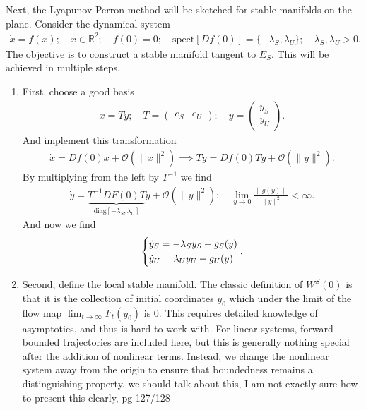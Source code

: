 Next, the Lyapunov-Perron method will be sketched for stable manifolds on the plane. Consider the dynamical system
\begin{align}
	\dot{x} = f(x);\quad x \in \mathbb{R}^{2};\quad f(0)=0;\quad  \textrm{spect} [Df(0)] = \{ - \lambda _{S}, \lambda _{U}\};\quad \lambda _S, \lambda_U > 0. \label{eq9:LP_method1}
\end{align}
The objective is to construct a stable manifold tangent to $E_{S}$. This will be achieved in multiple steps.
\begin{enumerate}
	\item First, choose a good basis
		\begin{align}
			x = Ty;\quad T = 
			\begin{pmatrix}
				e_{S} & e_{U}
			\end{pmatrix}
		;\quad y =
		\begin{pmatrix}
			y_S \\
			y_U
		\end{pmatrix}
		.
		\end{align}
	And implement this transformation 
	\begin{align}
		\dot{x} = Df(0)x + \mathcal{O}(\|x\|^{2}) \implies T\dot{y} = Df(0)Ty + \mathcal{O}(\| y\|^{2}).
	\end{align}
	By multiplying from the left by $T^{-1}$ we find
	\begin{align}
		\dot{y} = \underbrace{T^{-1}DF(0)T}_{ \textrm{diag} [-\lambda_S, \lambda_U ]}y + \mathcal{O}(\|y\|^{2});\quad \lim_{y \to 0} \frac{\|g(y)\|}{\|y\|^{2}}< \infty .
	\end{align}
	And now we find
	\begin{align}
		\begin{dcases}
			\dot{y}_{S} = - \lambda _{S}y_{S} + g_{S}(y) \\
			\dot{y}_{U} = \lambda _{U}y_{U} + g_{U}(y)
		\end{dcases}
		.
	\end{align}

\item Second, define the local stable manifold. The classic definition of $W^{S}(0)$ is that it is the collection of initial coordinates $y_0$ which under the limit of the flow map $\lim_{t \to \infty }F_{t}(y_0)$ is 0. This requires detailed knowledge of asymptotics, and thus is hard to work with. For linear systems, forward-bounded trajectories are included here, but this is generally nothing special after the addition of nonlinear terms. Instead, we change the nonlinear system away from the origin to ensure that boundedness remains a distinguishing property. 
	{\color{blue} we should talk about this, I am not exactly sure how to present this clearly, pg 127/128}


\end{enumerate}
